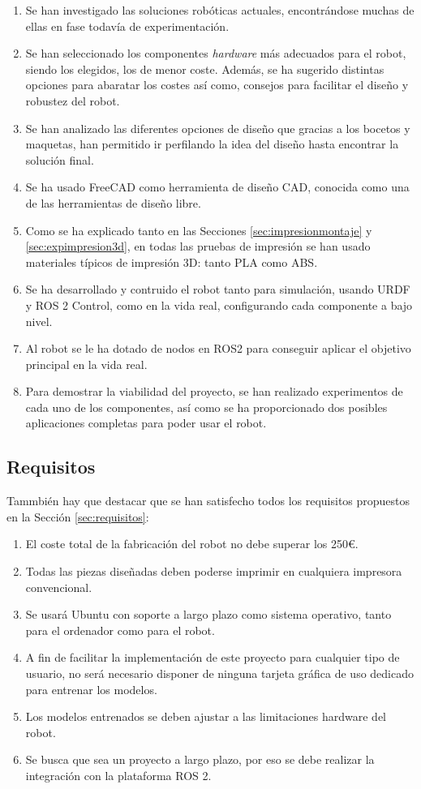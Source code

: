 \begin{enumerate}
	\item Se han investigado las soluciones robóticas actuales, encontrándose muchas de ellas en fase todavía de experimentación.
	\item Se han seleccionado los componentes \textit{hardware} más adecuados para el robot, siendo  los elegidos, los de menor coste. Además, se ha sugerido distintas opciones para abaratar los costes así como, consejos para facilitar el diseño y robustez del robot. 
	\item Se han analizado las diferentes opciones de diseño que gracias a los bocetos y maquetas, han permitido ir perfilando la idea del diseño hasta encontrar la solución final.
	\item Se ha usado FreeCAD como herramienta de diseño \acs{CAD}, conocida como una de las herramientas de diseño libre. 
	\item Como se ha explicado tanto en las Secciones \ref{sec:impresionmontaje} y \ref{sec:expimpresion3d}, en todas las pruebas de impresión se han usado materiales típicos de impresión 3D: tanto PLA como ABS.
	\item Se ha desarrollado  y contruido el robot tanto para simulación, usando URDF y ROS 2 Control, como en la vida real, configurando cada componente a bajo nivel.
	\item Al robot se le ha dotado de nodos en ROS2 para conseguir aplicar el objetivo principal en la vida real.
	\item Para demostrar la viabilidad del proyecto, se han realizado experimentos de cada uno de los componentes, así como se ha proporcionado dos posibles aplicaciones completas para poder usar el robot.  
\end{enumerate}

\subsection{Requisitos}

Tammbién hay que destacar que se han satisfecho todos los requisitos propuestos en la Sección \ref{sec:requisitos}:

\begin{enumerate}
	\item El coste total de la fabricación del robot no debe superar los 250€.
	\item Todas las piezas diseñadas deben poderse imprimir en cualquiera impresora convencional.
	\item Se usará Ubuntu con soporte a largo plazo como sistema operativo, tanto para el ordenador como para el robot.
	\item A fin de facilitar la implementación de este proyecto para cualquier tipo de usuario, no será necesario disponer de ninguna tarjeta gráfica de uso dedicado para entrenar los modelos. 
	\item Los modelos entrenados se deben ajustar a las limitaciones hardware del robot.
	\item Se busca que sea un proyecto a largo plazo, por eso se debe realizar la integración con la plataforma ROS 2. 
\end{enumerate}


